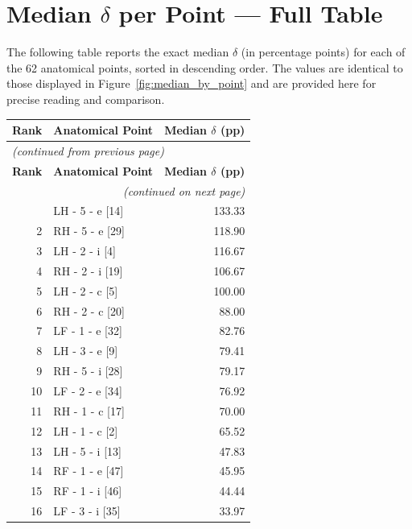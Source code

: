 \documentclass[11pt,a4paper]{article}
\begin{document}
\newpage

\section{Median \texorpdfstring{$\delta$}{delta} per Point --- Full Table}

The following table reports the exact median $\delta$ (in percentage points)
for each of the 62 anatomical points, sorted in descending order.
The values are identical to those displayed in Figure~\ref{fig:median_by_point}
and are provided here for precise reading and comparison.

\bigskip

\begin{longtable}{@{}rlr@{}}
\toprule
\textbf{Rank} & \textbf{Anatomical Point} & \textbf{Median $\delta$ (pp)} \\
\midrule
\endfirsthead
\multicolumn{3}{l}{\small\itshape (continued from previous page)} \\
\toprule
\textbf{Rank} & \textbf{Anatomical Point} & \textbf{Median $\delta$ (pp)} \\
\midrule
\endhead
\midrule
\multicolumn{3}{r}{\small\itshape (continued on next page)} \\
\endfoot
\bottomrule
\endlastfoot
    1 & LH - 5 - e [14] & 133.33 \\
    2 & RH - 5 - e [29] & 118.90 \\
    3 & LH - 2 - i [4] & 116.67 \\
    4 & RH - 2 - i [19] & 106.67 \\
    5 & LH - 2 - c [5] & 100.00 \\
    6 & RH - 2 - c [20] & 88.00 \\
    7 & LF - 1 - e [32] & 82.76 \\
    8 & LH - 3 - e [9] & 79.41 \\
    9 & RH - 5 - i [28] & 79.17 \\
    10 & LF - 2 - e [34] & 76.92 \\
    11 & RH - 1 - c [17] & 70.00 \\
    12 & LH - 1 - c [2] & 65.52 \\
    13 & LH - 5 - i [13] & 47.83 \\
    14 & RF - 1 - e [47] & 45.95 \\
    15 & RF - 1 - i [46] & 44.44 \\
    16 & LF - 3 - i [35] & 33.97 \\

\end{longtable}
\end{document}
